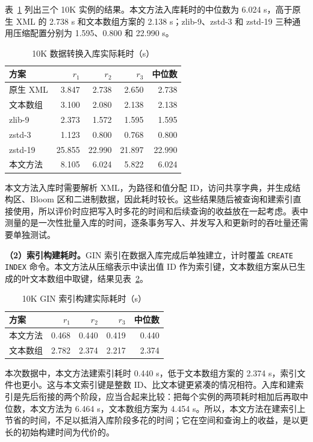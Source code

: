 表~\ref{tab:exp-materialization} 列出三个 10K 实例的结果。本文方法入库耗时的中位数为 6.024 s，高于原生 XML 的 2.738 s 和文本数组方案的 2.138 s；zlib-9、zstd-3 和 zstd-19 三种通用压缩配置分别为 1.595、0.800 和 22.990 s。
\begin{table}[htbp]
\centering\small
\caption{10K 数据转换入库实际耗时（s）}
\label{tab:exp-materialization}
\begin{tabular}{lrrrr}
\toprule
方案 & $r_1$ & $r_2$ & $r_3$ & 中位数 \\
\midrule
原生 XML & 3.847 & 2.738 & 2.650 & 2.738 \\
文本数组 & 3.100 & 2.080 & 2.138 & 2.138 \\
zlib-9 & 2.373 & 1.572 & 1.595 & 1.595 \\
zstd-3 & 1.123 & 0.800 & 0.768 & 0.800 \\
zstd-19 & 25.855 & 22.990 & 21.897 & 22.990 \\
本文方法 & 8.105 & 6.024 & 5.822 & 6.024 \\
\bottomrule
\end{tabular}
\end{table}

本文方法入库时需要解析 XML，为路径和值分配 ID，访问共享字典，并生成结构区、Bloom 区和二进制数据，因此耗时较长。这些结果随后被查询和建索引直接使用，所以评价时应把写入时多花的时间和后续查询的收益放在一起考虑。表中测量的是一次性批量入库的时间，逐条事务写入、并发写入和更新时的吞吐量还需要单独测试。

\textbf{（2）索引构建耗时。}GIN 索引在数据入库完成后单独建立，计时覆盖 \texttt{CREATE INDEX} 命令。本文方法从压缩表示中读出值 ID 作为索引键，文本数组方案从已生成的叶文本数组中取键，结果见表~\ref{tab:exp-index-build}。
\begin{table}[htbp]
\centering\small
\caption{10K GIN 索引构建实际耗时（s）}
\label{tab:exp-index-build}
\begin{tabular}{lrrrr}
\toprule
方案 & $r_1$ & $r_2$ & $r_3$ & 中位数 \\
\midrule
本文方法 & 0.468 & 0.440 & 0.419 & 0.440 \\
文本数组 & 2.782 & 2.374 & 2.217 & 2.374 \\
\bottomrule
\end{tabular}
\end{table}

本次数据中，本文方法建索引耗时 0.440 s，低于文本数组方案的 2.374 s，索引文件也更小。这与本文索引键是整数 ID、比文本键更紧凑的情况相符。入库和建索引是先后衔接的两个阶段，应当合起来比较：把每个实例的两项耗时相加后再取中位数，本文方法为 6.464 s，文本数组方案为 4.454 s。所以，本文方法在建索引上节省的时间，不足以抵消入库阶段多花的时间；它在空间和查询上的收益，是以更长的初始构建时间为代价的。


